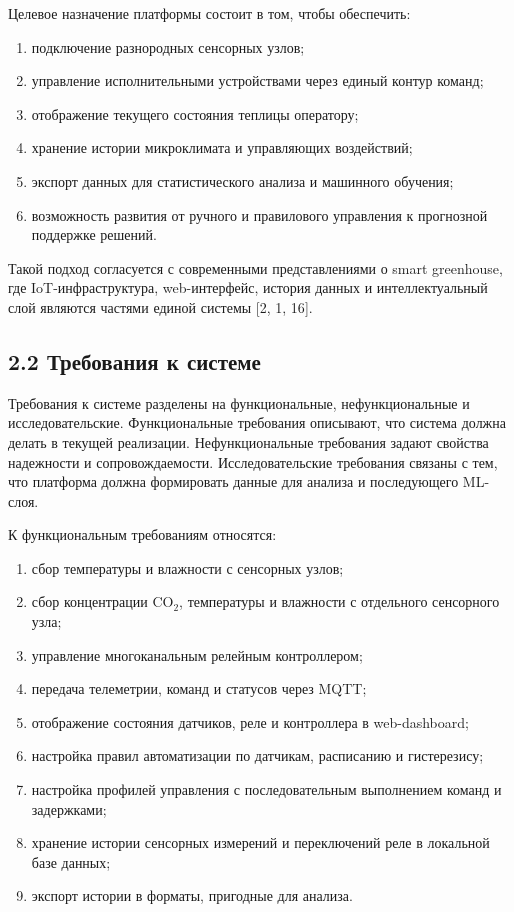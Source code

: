 \documentclass[a4paper,14pt]{extarticle}
\providecommand{\tightlist}{%
  \setlength{\itemsep}{0pt}\setlength{\parskip}{0pt}}
\begin{document}
Целевое назначение платформы состоит в том, чтобы обеспечить:

\begin{enumerate}
\def\labelenumi{\arabic{enumi})}
\tightlist
\item
  подключение разнородных сенсорных узлов;
\item
  управление исполнительными устройствами через единый контур команд;
\item
  отображение текущего состояния теплицы оператору;
\item
  хранение истории микроклимата и управляющих воздействий;
\item
  экспорт данных для статистического анализа и машинного обучения;
\item
  возможность развития от ручного и правилового управления к прогнозной
  поддержке решений.
\end{enumerate}

Такой подход согласуется с современными представлениями о smart
greenhouse, где IoT-инфраструктура, web-интерфейс, история данных и
интеллектуальный слой являются частями единой системы {[}2, 1, 16{]}.

\hypertarget{ux442ux440ux435ux431ux43eux432ux430ux43dux438ux44f-ux43a-ux441ux438ux441ux442ux435ux43cux435}{%
\subsection{2.2 Требования к
системе}\label{ux442ux440ux435ux431ux43eux432ux430ux43dux438ux44f-ux43a-ux441ux438ux441ux442ux435ux43cux435}}

Требования к системе разделены на функциональные, нефункциональные и
исследовательские. Функциональные требования описывают, что система
должна делать в текущей реализации. Нефункциональные требования задают
свойства надежности и сопровождаемости. Исследовательские требования
связаны с тем, что платформа должна формировать данные для анализа и
последующего ML-слоя.

К функциональным требованиям относятся:

\begin{enumerate}
\def\labelenumi{\arabic{enumi})}
\tightlist
\item
  сбор температуры и влажности с сенсорных узлов;
\item
  сбор концентрации CO\(_2\), температуры и влажности с отдельного
  сенсорного узла;
\item
  управление многоканальным релейным контроллером;
\item
  передача телеметрии, команд и статусов через MQTT;
\item
  отображение состояния датчиков, реле и контроллера в web-dashboard;
\item
  настройка правил автоматизации по датчикам, расписанию и гистерезису;
\item
  настройка профилей управления с последовательным выполнением команд и
  задержками;
\item
  хранение истории сенсорных измерений и переключений реле в локальной
  базе данных;
\item
  экспорт истории в форматы, пригодные для анализа.
\end{enumerate}
\end{document}

